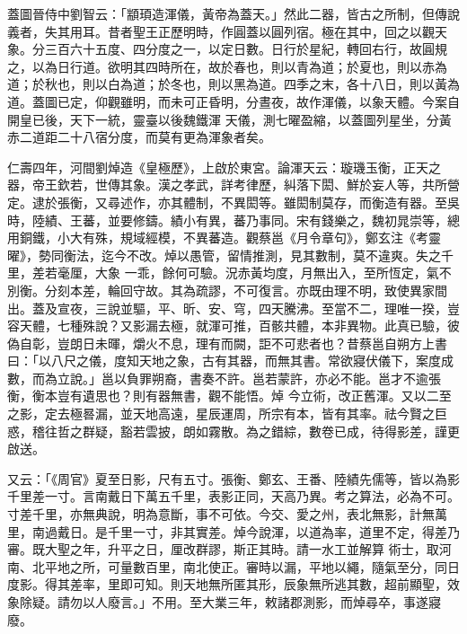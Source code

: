 \begin{pinyinscope}
 蓋圖晉侍中劉智云：「顓頊造渾儀，黃帝為蓋天。」然此二器，皆古之所制，但傳說義者，失其用耳。昔者聖王正歷明時，作圓蓋以圓列宿。極在其中，回之以觀天象。分三百六十五度、四分度之一，以定日數。日行於星紀，轉回右行，故圓規之，以為日行道。欲明其四時所在，故於春也，則以青為道；於夏也，則以赤為道；於秋也，則以白為道；於冬也，則以黑為道。四季之末，各十八日，則以黃為道。蓋圖已定，仰觀雖明，而未可正昏明，分晝夜，故作渾儀，以象天體。今案自開皇已後，天下一統，靈臺以後魏鐵渾
 天儀，測七曜盈縮，以蓋圖列星坐，分黃赤二道距二十八宿分度，而莫有更為渾象者矣。



 仁壽四年，河間劉焯造《皇極歷》，上啟於東宮。論渾天云：璇璣玉衡，正天之器，帝王欽若，世傳其象。漢之孝武，詳考律歷，糾落下閎、鮮於妄人等，共所營定。逮於張衡，又尋述作，亦其體制，不異閎等。雖閎制莫存，而衡造有器。至吳時，陸績、王蕃，並要修鑄。績小有異，蕃乃事同。宋有錢樂之，魏初晁崇等，總用銅鐵，小大有殊，規域經模，不異蕃造。觀蔡邕《月令章句》，鄭玄注《考靈曜》，勢同衡法，迄今不改。焯以愚管，留情推測，見其數制，莫不違爽。失之千里，差若毫厘，大象
 一乖，餘何可驗。況赤黃均度，月無出入，至所恆定，氣不別衡。分刻本差，輪回守故。其為疏謬，不可復言。亦既由理不明，致使異家間出。蓋及宣夜，三說並驅，平、昕、安、穹，四天騰沸。至當不二，理唯一揆，豈容天體，七種殊說？又影漏去極，就渾可推，百骸共體，本非異物。此真已驗，彼偽自彰，豈朗日未暉，爝火不息，理有而闕，詎不可悲者也？昔蔡邕自朔方上書曰：「以八尺之儀，度知天地之象，古有其器，而無其書。常欲寢伏儀下，案度成數，而為立說。」邕以負罪朔裔，書奏不許。邕若蒙許，亦必不能。邕才不逾張衡，衡本豈有遺思也？則有器無書，觀不能悟。焯
 今立術，改正舊渾。又以二至之影，定去極晷漏，並天地高遠，星辰運周，所宗有本，皆有其率。祛今賢之巨惑，稽往哲之群疑，豁若雲披，朗如霧散。為之錯綜，數卷已成，待得影差，謹更啟送。



 又云：「《周官》夏至日影，尺有五寸。張衡、鄭玄、王番、陸績先儒等，皆以為影千里差一寸。言南戴日下萬五千里，表影正同，天高乃異。考之算法，必為不可。寸差千里，亦無典說，明為意斷，事不可依。今交、愛之州，表北無影，計無萬里，南過戴日。是千里一寸，非其實差。焯今說渾，以道為率，道里不定，得差乃審。既大聖之年，升平之日，厘改群謬，斯正其時。請一水工並解算
 術士，取河南、北平地之所，可量數百里，南北使正。審時以漏，平地以繩，隨氣至分，同日度影。得其差率，里即可知。則天地無所匿其形，辰象無所逃其數，超前顯聖，效象除疑。請勿以人廢言。」不用。至大業三年，敕諸郡測影，而焯尋卒，事遂寢廢。




\end{pinyinscope}

